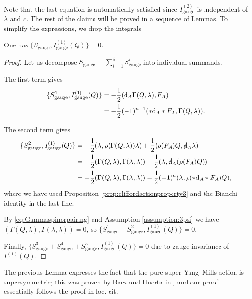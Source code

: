 \documentclass[10pt, oneside]{article}
\newcommand{\gauge}{\mathrm{gauge}}
\begin{document}
Note that the last equation is automatically satisfied since $I_{\gauge}^{(2)}$ is independent of $\lambda$ and $c$. The rest of the claims will be proved in a sequence of Lemmas. To simplify the expressions, we drop the integrals.

\begin{lemma}
One has $\{S_{\gauge}, I_{\gauge}^{(1)}(Q)\} = 0$.
\label{lm:gaugemultiplet1}
\end{lemma}
\begin{proof}
Let us decompose $S_{\gauge} = \sum_{i=1}^5 S_{\gauge}^i$ into individual summands.

The first term gives
\begin{align*}
\{S_{\gauge}^1, I_{\gauge}^{(1)}(Q)\} &= -\frac{1}{2} (\d_A \Gamma(Q, \lambda), F_A)\\
&= -\frac{1}{2}(-1)^{n-1} (\ast \d_A \ast F_A, \Gamma(Q, \lambda)).
\end{align*}

The second term gives
\begin{align*}
\{S_{\gauge}^2, I_{\gauge}^{(1)}(Q)\} &= -\frac{1}{2}(\lambda, \rho(\Gamma(Q, \lambda))\lambda) + \frac{1}{2}(\rho(F_A) Q, \sd{\d}_A\lambda) \\
&= -\frac{1}{2}(\Gamma(Q, \lambda), \Gamma(\lambda, \lambda))  - \frac{1}{2}(\lambda, \sd{\d}_A(\rho(F_A) Q)) \\
&= -\frac{1}{2}(\Gamma(Q, \lambda), \Gamma(\lambda, \lambda)) - \frac{1}{2} (-1)^n (\lambda, \rho(\ast \d_A\ast F_A) Q),
\end{align*}
where we have used Proposition \ref{prop:cliffordactionproperty3} and the Bianchi identity in the last line.

By \eqref{eq:Gammaspinorpairing} and Assumption \ref{assumption:3psi} we have $(\Gamma(Q, \lambda), \Gamma(\lambda, \lambda)) = 0$, so $\{S_{\gauge}^1 + S_{\gauge}^2, I_{\gauge}^{(1)}(Q)\} = 0$.

Finally, $\{S_{\gauge}^3 + S_{\gauge}^4 + S_{\gauge}^5, I_{\gauge}^{(1)}(Q)\} = 0$ due to gauge-invariance of $I^{(1)}(Q)$.
\end{proof}

\begin{remark}
The previous Lemma expresses the fact that the pure super Yang--Mills action is supersymmetric; this was proven by Baez and Huerta in \cite{BaezHuerta}, and our proof essentially follows the proof in loc. cit.
\end{remark}
\end{document}
